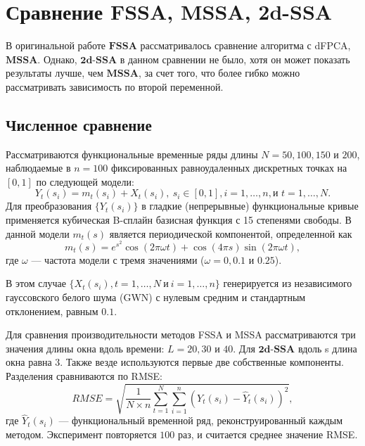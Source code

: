 \documentclass[a4paper, 11pt]{article}
\newcommand{\MSSA}{\textbf{MSSA}}
\newcommand{\FSSA}{\textbf{FSSA}}
\newcommand{\DSSA}{\textbf{2d-SSA}}
\begin{document}
\newpage

\section{Сравнение FSSA, MSSA, 2d-SSA}

\label{sec:compare_fssa_ssa}

В оригинальной работе $\FSSA$ \cite{haghbin2019functionalsingularspectrumanalysis} рассматривалось сравнение алгоритма с dFPCA, $\MSSA$. Однако, $\DSSA$ в данном сравнении не было, хотя он может показать результаты лучше, чем $\MSSA$, за счет того, что более гибко можно рассматривать зависимость по второй переменной. 


\subsection{Численное сравнение}

Рассматриваются функциональные временные ряды длины $N=50, 100, 150$ и $200$, наблюдаемые в $n=100$ фиксированных равноудаленных дискретных точках на $[0,1]$ по следующей модели:
\begin{equation}\label{eq:mainmodel}
Y_t\left(s_i\right)=m_t(s_i)+X_t\left(s_i\right),\ s_i \in [0,1], i=1,\ldots,n, \text{и } t=1, \dots, N.
\end{equation}
Для преобразования $\{Y_t(s_i)\}$ в гладкие (непрерывные) функциональные кривые применяется кубическая B-сплайн базисная функция с 15 степенями свободы. В данной модели $m_t(s)$ является периодической компонентой, определенной как
\begin{equation}\label{eq:Trend}
m_t(s)=e^{s^2} \cos\left(2\pi \omega t\right)+\cos(4\pi s) \sin\left(2\pi \omega t\right),
\end{equation}
где $\omega$ — частота модели с тремя значениями ($\omega=0, 0.1$ и $0.25$).

В этом случае $\{X_t(s_i), t=1,\ldots, N\ \text{и}\ i=1,\ldots,n \}$ генерируется из независимого гауссовского белого шума (GWN) с нулевым средним и стандартным отклонением, равным $0.1$.

Для сравнения производительности методов FSSA и MSSA рассматриваются три значения длины окна вдоль времени: $L=20, 30$ и $40$. Для $\DSSA$ вдоль s длина окна равна 3. Также везде используются первые две собственные компоненты. Разделения сравниваются по RMSE:
\[RMSE= \sqrt {\frac{1}{N\times n}\sum\limits_{t=1}^N \sum_{i=1}^n \left(Y_t(s_i)-\hat{Y}_t(s_i)\right)^2},\]
где $\hat{Y}_t(s_i)$ — функциональный временной ряд, реконструированный каждым методом. Эксперимент повторяется $100$ раз, и считается среднее значение RMSE.
\end{document}
